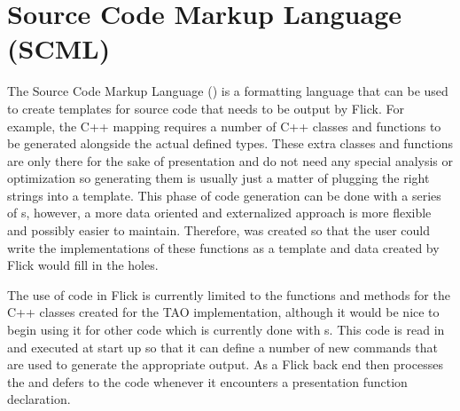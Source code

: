 

\chapter{Source Code Markup Language (SCML)}
\label{cha:SCML}

The Source Code Markup Language (\SCML{}) is a formatting language that can be
used to create templates for source code that needs to be output by Flick.  For
example, the \CORBA{} C++ mapping requires a number of C++ classes and functions
to be generated alongside the actual defined types.  These extra classes and
functions are only there for the sake of presentation and do not need any
special analysis or optimization so generating them is usually just a matter of
plugging the right strings into a template.  This phase of code generation can
be done with a series of s, however, a more data oriented and
externalized approach is more flexible and possibly easier to maintain.
Therefore, \SCML{} was created so that the user could write the implementations of
these functions as a template and data created by Flick would fill in the
holes.

The use of \SCML{} code in Flick is currently limited to the functions and methods
for the \CORBA{} C++ classes created for the TAO implementation, although it would
be nice to begin using it for other code which is currently done with
s.  This code is read in and executed at start up so that it
can define a number of new commands that are used to generate the appropriate
output.  As a Flick back end then processes the \PRESC{} and defers to the \SCML{}
code whenever it encounters a presentation function declaration.

